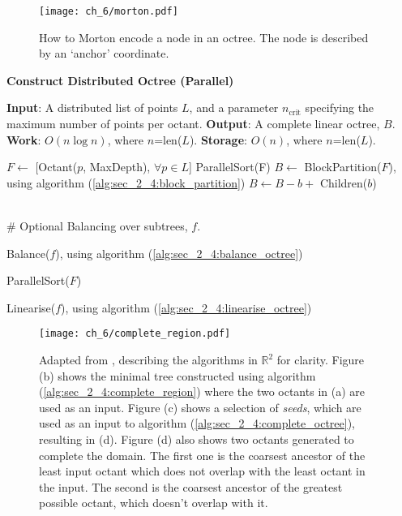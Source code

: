 \begin{figure}
    \centerline{\texttt{[image: ch\_6/morton.pdf]}}
    \caption{How to Morton encode a node in an octree. The node is described by an `anchor' coordinate.}
    \label{fig:sec_2_4:morton}
\end{figure}

\begin{algorithm}
    \caption{\textbf{Construct Distributed Octree (Parallel)}}
    \label{alg:sec_2_4:point2octree}
    \begin{algorithmic}
        \STATE \textbf{Input}: A distributed list of points $L$, and a parameter $n_{\text{crit}}$ specifying the maximum number of points per octant.
        \STATE \textbf{Output}: A complete linear octree, $B$. 
        \STATE \textbf{Work}: $O(n \log n)$, where $n$=len($L$).
        \STATE \textbf{Storage}: $O(n)$, where $n$=len($L$).
        
        \STATE $F \gets $ [Octant($p$, MaxDepth), $\forall p \in L$]
        \STATE ParallelSort(F)
        \STATE $B \gets $ BlockPartition($F$), using algorithm (\ref{alg:sec_2_4:block_partition})
                \STATE $B \gets B - b + $ Children($b$)
            \ENDIF
        \ENDFOR

        \STATE \\\# Optional Balancing over subtrees, $f$.

                \STATE Balance($f$), using algorithm (\ref{alg:sec_2_4:balance_octree})
            \ENDFOR

            \STATE ParallelSort($F$)
            
                \STATE Linearise($f$), using algorithm (\ref{alg:sec_2_4:linearise_octree})
            \ENDFOR
        \ENDIF

    \end{algorithmic}
\end{algorithm}

\begin{figure}
    \centerline{\texttt{[image: ch\_6/complete\_region.pdf]}}
    \caption{Adapted from \cite{sundar2008bottom}, describing the algorithms in $\mathbb{R}^2$ for clarity. Figure (b) shows the minimal tree constructed using algorithm (\ref{alg:sec_2_4:complete_region}) where the two octants in (a) are used as an input. Figure (c) shows a selection of \textit{seeds}, which are used as an input to algorithm (\ref{alg:sec_2_4:complete_octree}), resulting in (d). Figure (d) also shows two octants generated to complete the domain.  The first one is the coarsest ancestor of the least input octant which does not overlap with the least octant in the input. The second is the coarsest ancestor of the greatest possible octant, which doesn't overlap with it.}
    \label{fig:sec_2_4:complete}
\end{figure}

